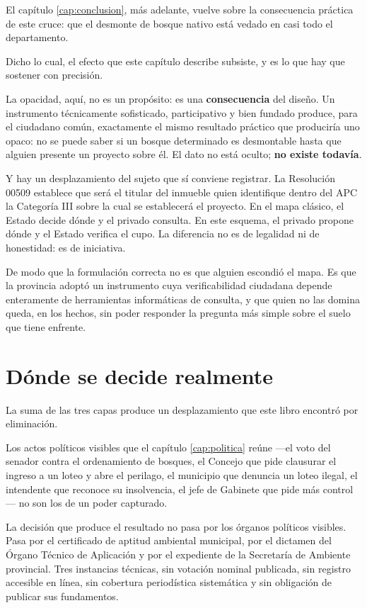 El capítulo \ref{cap:conclusion}, más adelante, vuelve sobre la consecuencia práctica de este cruce: que el desmonte de bosque nativo está vedado en casi todo el departamento.

Dicho lo cual, el efecto que este capítulo describe subsiste, y es lo que hay que sostener con precisión.

La opacidad, aquí, no es un propósito: es una \textbf{consecuencia} del diseño. Un instrumento técnicamente sofisticado, participativo y bien fundado produce, para el ciudadano común, exactamente el mismo resultado práctico que produciría uno opaco: no se puede saber si un bosque determinado es desmontable hasta que alguien presente un proyecto sobre él. El dato no está oculto; \textbf{no existe todavía}.

Y hay un desplazamiento del sujeto que sí conviene registrar. La Resolución 00509 establece que será el titular del inmueble quien identifique dentro del APC la Categoría III sobre la cual se establecerá el proyecto. En el mapa clásico, el Estado decide dónde y el privado consulta. En este esquema, el privado propone dónde y el Estado verifica el cupo. La diferencia no es de legalidad ni de honestidad: es de iniciativa.

De modo que la formulación correcta no es que alguien escondió el mapa. Es que la provincia adoptó un instrumento cuya verificabilidad ciudadana depende enteramente de herramientas informáticas de consulta, y que quien no las domina queda, en los hechos, sin poder responder la pregunta más simple sobre el suelo que tiene enfrente.

\section{Dónde se decide realmente}

La suma de las tres capas produce un desplazamiento que este libro encontró por eliminación.

Los actos políticos visibles que el capítulo \ref{cap:politica} reúne ---el voto del senador contra el ordenamiento de bosques, el Concejo que pide clausurar el ingreso a un loteo y abre el perilago, el municipio que denuncia un loteo ilegal, el intendente que reconoce su insolvencia, el jefe de Gabinete que pide más control--- no son los de un poder capturado.

La decisión que produce el resultado no pasa por los órganos políticos visibles. Pasa por el certificado de aptitud ambiental municipal, por el dictamen del Órgano Técnico de Aplicación y por el expediente de la Secretaría de Ambiente provincial. Tres instancias técnicas, sin votación nominal publicada, sin registro accesible en línea, sin cobertura periodística sistemática y sin obligación de publicar sus fundamentos.

